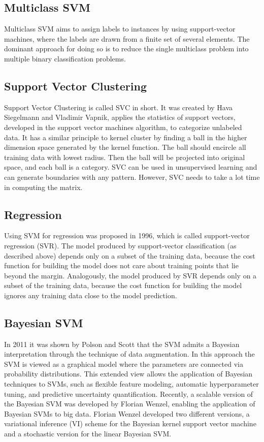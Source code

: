 \documentclass{article}
\begin{document}
\subsection{Multiclass SVM}
Multiclass SVM aims to assign labels to instances by using support-vector machines, where the labels are drawn from a finite set of several elements. The dominant approach for doing so is to reduce the single multiclass problem into multiple binary classification problems\cite{7}. 
\subsection{Support Vector Clustering}
Support Vector Clustering is called SVC in short. It was created by Hava Siegelmann and Vladimir Vapnik, applies the statistics of support vectors, developed in the support vector machines algorithm, to categorize unlabeled data. It has a similar principle to kernel cluster by finding a ball in the higher dimension space generated by the kernel function\cite{8}. The ball should encircle all training data with lowest radius. Then the ball will be projected into original space, and each ball is a category. SVC can be used in unsupervised learning and can generate boundaries with any pattern. However, SVC needs to take a lot time in computing the matrix.
\subsection{Regression}
Using SVM for regression was proposed in 1996, which is called support-vector regression (SVR)\cite{9}. The model produced by support-vector classification (as described above) depends only on a subset of the training data, because the cost function for building the model does not care about training points that lie beyond the margin. Analogously, the model produced by SVR depends only on a subset of the training data, because the cost function for building the model ignores any training data close to the model prediction.
\subsection{Bayesian SVM}
In 2011 it was shown by Polson and Scott that the SVM admits a Bayesian interpretation through the technique of data augmentation\cite{10}. In this approach the SVM is viewed as a graphical model where the parameters are connected via probability distributions. This extended view allows the application of Bayesian techniques to SVMs, such as flexible feature modeling, automatic hyperparameter tuning, and predictive uncertainty quantification. Recently, a scalable version of the Bayesian SVM was developed by Florian Wenzel, enabling the application of Bayesian SVMs to big data. Florian Wenzel developed two different versions, a variational inference (VI) scheme for the Bayesian kernel support vector machine and a stochastic version  for the linear Bayesian SVM.
\end{document}
